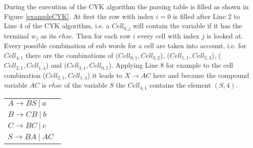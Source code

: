 \begin{testexample}
During the execution of the CYK algorithm the parsing table is filled as shown in Figure \ref{exampleCYK}. At first the row with index $i=0$ is filled after Line 2 to Line 4 of the CYK algorithm, i.e. a $Cell_{0,j}$ will contain the variable if it has the terminal $w_j$ as its $rhse$. Then for each row $i$ every cell with index $j$ is looked at. Every possible combination of sub words for a cell are taken into account, i.e. for $Cell_{4,1}$ there are the combinations of ($Cell_{0,1},Cell_{3,2}$), ($Cell_{1,1},Cell_{2,3}$), ($Cell_{2,1},Cell_{1,4}$) and ($Cell_{3,1},Cell_{0,5}$). Applying Line 8 for example to the cell combination ($Cell_{2,1},Cell_{1,4}$) it leads to $X\rightarrow AC$ here and because the compound variable $AC$ is $rhse$ of the variable $S$ the $Cell_{4,1}$ contains the element $(S,4)$.\\
	\begin{minipage}{6in}
		\centering
		\begin{tabular}{l}
			$A\rightarrow B S~|~a~~$\\ 
			$B\rightarrow C B~|~b$\\ 
			$C\rightarrow B C~|~ c$\\ 
			$S\rightarrow B A~|~A C~~$\\ 
		\end{tabular}
\end{minipage}
\end{testexample}
